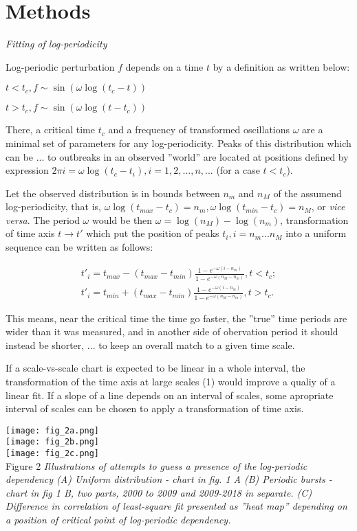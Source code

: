 \documentclass[a4paper]{article}
\begin{document}
\newpage
\section*{Methods}

\textit{Fitting of log-periodicity}

Log-periodic perturbation $f$ depends on a time $t$ by a definition as written below: 

$t < t_c, f \sim \sin( \omega \log( t_c - t ) )$

$t > t_c, f \sim \sin( \omega \log( t - t_c ) )$

There, a critical time $t_c$ and a frequency of transformed oscillations $\omega$ are a minimal set of parameters for any log-periodicity. Peaks of this distribution which can be ... to outbreaks in an observed ''world'' are located at positions defined by expression $ 2 \pi i =  \omega \log( t_c - t_i ), i = 1, 2,  ..., n, ... $ (for a case $t < t_c$).

Let the observed distribution is in bounds between $n_m$ and $n_M$ of the assumend log-periodicity, that is, $\omega \log( t_{max} - t_c )  = n_m, \omega \log( t_{min} - t_c ) = n_M$, or \textit{vice versa}. The period $\omega$ would be then $\omega = \log( n_M ) - \log( n_m ) $, transformation of time axis $t \to t'$ which put the position of peaks $t_i, i = n_m ... n_M$ into a uniform sequence can be written as follows:

\begin{eqnarray}
t'_i = t_{max} - ( t_{max} - t_{min} )\frac{ 1 - e^{ - \omega ( i - n_m ) } }{ 1 - e^{ - \omega (n_M - n_m) } }, t < t_c; \nonumber\\
t'_i = t_{min} + ( t_{max} - t_{min} )\frac{ 1 - e^{ - \omega ( i - n_m ) } }{ 1 - e^{ - \omega (n_M - n_m) } }, t > t_c.
\end{eqnarray}

This means, near the critical time the time go faster, the ''true'' time periods are wider than it was measured, and in another side of obervation period it should instead be shorter, ... to keep an overall match to a given time scale. 

\newpage
If a scale-vs-scale chart is expected to be linear in a whole interval, the transformation of the time axis at large scales (1) would improve a qualiy of a linear fit. If a slope of a line depends on an interval of scales, some apropriate interval of scales can be chosen to apply a transformation of time axis.

\noindent
\texttt{[image: fig\_2a.png]}\\
\texttt{[image: fig\_2b.png]}\\
\texttt{[image: fig\_2c.png]}\\
\vskip 12pt
Figure 2 \textit{Illustrations of attempts to guess a presence of the log-periodic dependency (A) Uniform distribution - chart in fig. 1 A (B) Periodic bursts - chart in fig 1 B, two parts, 2000 to 2009 and 2009-2018 in separate. (C) Difference in correlation of least-square fit presented as ''heat map'' depending on a position of critical point of log-periodic dependency.}
\vskip 12pt
\end{document}
